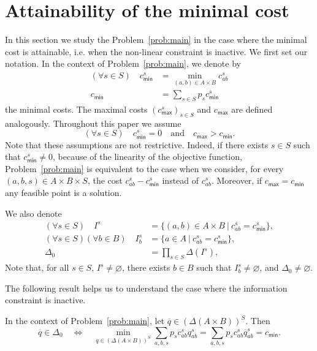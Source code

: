 \documentclass[smallextended,referee,envcountsect,]{svjour3}
\newcommand{\menge}[2]{\big\{{#1}~\big |~{#2}\big\}}
\begin{document}
\section{Attainability of the minimal cost}
\label{sec:InactiveIC}
In this section we study the Problem~\ref{prob:main}
in the case where the minimal cost is attainable, i.e. when the 
non-linear constraint is inactive. We first set our 
notation. 
In the context of Problem~\ref{prob:main}, we denote by 
\begin{align}
(\forall s\in S)\quad c_{\textsf{min}}^s &= \min_{(a,b) \in A\times B} 
c_{ab}^s\label{eq:Cmin}\\
c_{\textsf{min}} &= \sum_{s\in S}p_s 
c_{\textsf{min}}^s\label{eq:Cmin2}
\end{align}
the minimal costs. The maximal costs 
$(c_{\textsf{max}}^s)_{s\in S}$ 
and $c_{\textsf{max}}$ are 
defined analogously. Throughout this paper we assume
\begin{equation}
\label{e:H0}\tag{$H_0$}
(\forall s\in S) \quad c_{\textsf{min}}^s= 0\quad\text{and}\quad 
c_{\textsf{max}}>c_{\textsf{min}}.
\end{equation}
Note that these assumptions are not restrictive. Indeed, if there 
exists $s\in S$ such that {$c_{\textsf{min}}^s\neq 0$}, 
because of the 
linearity of the objective function, Problem~\ref{prob:main} is 
equivalent to the case when we consider, for every $(a,b,s)\in 
A\times B\times S$, the cost 
$c_{ab}^s-c_{\textsf{min}}^s$ instead of $c_{ab}^s$. Moreover, 
if $c_{\textsf{max}}=c_{\textsf{min}}$ any feasible point is a 
solution. 

We also denote 
\begin{align}
(\forall s\in S)\quad I^s &= \menge{(a,b) \in A\times B}{c_{ab}^s = 
c_{\textsf{min}}^s },\\
(\forall s\in S)(\forall b\in B)\quad I^s_b &= \menge{a\in 
A}{c_{ab}^s = 
c_{\textsf{min}}^s},\\
\Delta_0&=\prod_{s\in S}\Delta(I^s),
\label{e:defDeltamin}
\end{align}
Note that, for all $s\in S$, $I^s\neq \varnothing$, there exists 
$b\in B$ such that
$I^s_b\ne\varnothing$, and $\Delta_0\neq\varnothing$.


The following result helps us to understand the 
case where the information constraint is inactive.
\begin{proposition}
\label{p:achiev}
In the context of Problem~\ref{prob:main}, let 
$\overline{q}\in(\Delta(A\times B))^S$. Then 
\begin{equation}
\overline{q}\in\Delta_0\quad \Leftrightarrow\quad 
\min_{q\in(\Delta(A\times B))^S} 
\sum_{a,b,s}p_sc_{ab}^sq_{ab}^s=\sum_{a,b,s}p_sc_{ab}^s
\overline{q}_{ab}^s=c_{\textsf{min}}.
\end{equation}
\end{proposition}
\end{document}
